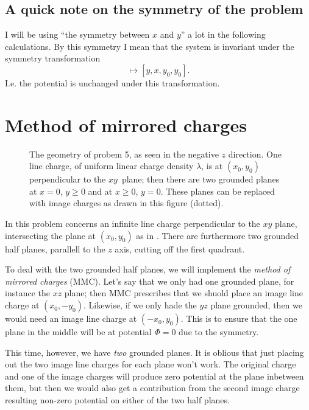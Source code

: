 \documentclass[11pt,letter, swedish, english
]{article}
\begin{document}
\subsection*{A quick note on the symmetry of the problem}
I will be using ``the symmetry between $x$ and $y$'' a lot in the
following calculations. By this symmetry I mean that the system is
invariant under the symmetry transformation 
\begin{equation}
[x, y, x_0, y_0] \mapsto [y, x, y_0, y_0].
\end{equation}
I.e. the potential is unchanged under this transformation.




\section{Method of mirrored charges}
\begin{figure}\centering

\caption{The geometry of probem 5, as seen in the negative $z$
  direction. One line charge, of uniform linear charge density
  $\lambda$, is at $(x_0, y_0)$ perpendicular to the $xy$~plane; then
  there are two grounded planes at $x=0$, $y\ge0$ and at $x\ge0$,
  $y=0$. These planes can be replaced with image charges as drawn in
  this figure (dotted). } 
\label{fig:5_geometry}
\end{figure}

In this problem concerns an infinite line charge perpendicular to the
$xy$ plane, intersecting the plane at  $(x_0, y_0)$ as in
. There are furthermore two grounded half
planes, parallell to the $z$ axis, cutting off the first quadrant. 

To deal with the two grounded half planes, we will implement the
\emph{method of mirrored charges} (MMC). Let's say that we only had one
grounded plane, for instance the $xz$ plane; then MMC prescribes that
we shuold place an image line charge at $(x_0, -y_0)$. Likewise, if we only
hade the $yz$ plane grounded, then we would need an image line charge
at $(-x_0, y_0)$. This is to ensure that the one plane in the middle
will be at potential $\Phi=0$ due to the symmetry. 

This time, however, we have \emph{two} grounded planes. It is oblious
that just placing out the two image line charges for each plane won't
work. The original charge and one of the image charges will produce
zero potential at the plane inbetween them, but then we would also get
a contribution from the second image charge resulting non-zero
potential on either of the two half planes. 
\end{document}
